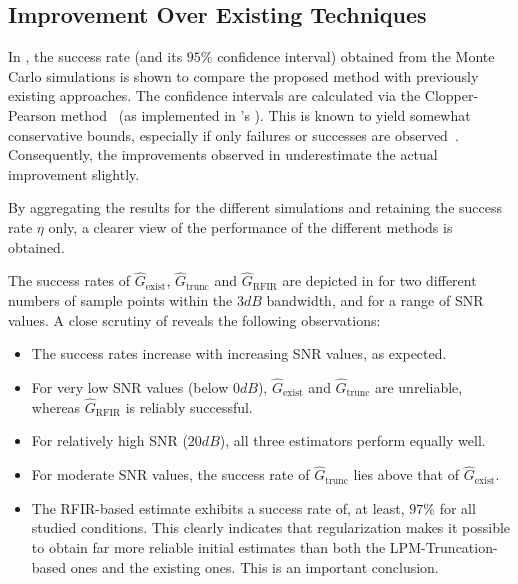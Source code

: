 \subsection{Improvement Over Existing Techniques}

In , the success rate (and its $95\%$ confidence interval) obtained from the Monte Carlo simulations is shown to compare the proposed method with previously existing approaches.
The confidence intervals are calculated via the Clopper-Pearson method~\citep{Clopper1934} (as implemented in \MATLAB's ).
This is known to yield somewhat conservative bounds, especially if only failures or successes are observed~\citep{Ross2003}.
Consequently, the improvements observed in  underestimate the actual improvement slightly.

By aggregating the results for the different simulations and retaining the success rate $\eta$ only, a clearer view of the performance of the different methods is obtained.

The success rates of $\hat G_\mathrm{exist}$, $\hat G_\mathrm{trunc}$ and $\hat G_\mathrm{RFIR}$ are depicted in   for two different numbers of sample points within the $3\unit{dB}$ bandwidth, and for a range of SNR values. A close scrutiny of   reveals the following observations: \begin{itemize}
\item The success rates increase with increasing SNR values, as expected.
\item For very low SNR values (below $0\unit{dB}$), $\hat G_\mathrm{exist}$ and $\hat G_\mathrm{trunc}$ are unreliable, whereas $\hat G_\mathrm{RFIR}$ is reliably successful. 
\item For relatively high SNR ($20\unit{dB}$), all three estimators perform equally well.
\item For moderate SNR values, the success rate of $\hat G_\mathrm{trunc}$ lies above that of $\hat G_\mathrm{exist}$.
\item The RFIR-based estimate exhibits a success rate of, at least, $97\%$ for all studied conditions. 
This clearly indicates that regularization makes it possible to obtain far more reliable initial estimates than both the LPM-Truncation-based ones and the existing ones. 
This is an important conclusion.
\end{itemize}

